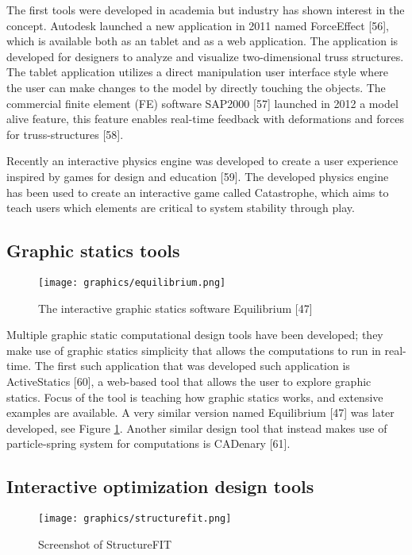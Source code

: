 The first tools were developed in academia but industry has shown interest in the concept. Autodesk launched a new application in 2011 named ForceEffect [56], which is available both as an tablet and as a web application. The application is developed for designers to analyze and visualize two-dimensional truss structures. The tablet application utilizes a direct manipulation user interface style where the user can make changes to the model by directly touching the objects. The commercial finite element (FE) software SAP2000 [57] launched in 2012 a model alive feature, this feature enables real-time feedback with deformations and forces for truss-structures [58].

Recently an interactive physics engine was developed to create a user experience inspired by games for design and education [59]. The developed physics engine has been used to create an interactive game called Catastrophe, which aims to teach users which elements are critical to system stability through play.

\subsection{Graphic statics tools}

\begin{figure}
  \texttt{[image: graphics/equilibrium.png]}
  \caption{The interactive graphic statics software Equilibrium [47]}
  \label{fig:equilibrium}
\end{figure}

Multiple graphic static computational design tools have been developed; they make use of graphic statics simplicity that allows the computations to run in real-time. The first such application that was developed such application is ActiveStatics [60], a web-based tool that allows the user to explore graphic statics. Focus of the tool is teaching how graphic statics works, and extensive examples are available. A very similar version named Equilibrium [47] was later developed, see Figure \ref{fig:equilibrium}. Another similar design tool that instead makes use of particle-spring system for computations is CADenary [61].


\subsection{Interactive optimization design tools}

\begin{figure}
  \texttt{[image: graphics/structurefit.png]}
  \caption{Screenshot of StructureFIT}
  \label{fig:structurefit}
\end{figure}

